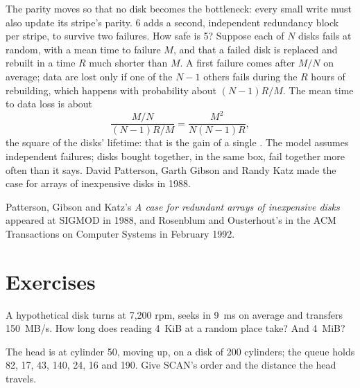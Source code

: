 The parity moves so that no disk becomes the bottleneck: every small write must also update its stripe's parity.  6 adds a second, independent redundancy block per stripe, to survive two failures. How safe is  5? Suppose each of $N$ disks fails at random, with a mean time to failure $M$, and that a failed disk is replaced and rebuilt in a time $R$ much shorter than $M$. A first failure comes after $M/N$ on average; data are lost only if one of the $N - 1$ others fails during the $R$ hours of rebuilding, which happens with probability about $(N - 1)R/M$. The mean time to data loss is about
\[ \frac{M/N}{(N - 1)R/M} = \frac{M^2}{N(N - 1)R}, \]
the square of the disks' lifetime: that is the gain of a single . The model assumes independent failures; disks bought together, in the same box, fail together more often than it says. David Patterson, Garth Gibson and Randy Katz made the case for arrays of inexpensive disks in 1988. %

\begin{history}[Storage]
Patterson, Gibson and Katz's \emph{A case for redundant arrays of inexpensive disks} appeared at SIGMOD in 1988, %
and Rosenblum and Ousterhout's  in the ACM Transactions on Computer Systems in February 1992. %
\end{history}

\section{Exercises}\label{sec:b3:file-systems:exercises}

\begin{exercise}[$\star$]\label{exo:b3:file-systems:1}
A hypothetical disk turns at 7,200 rpm, seeks in 9~ms on average and transfers 150~MB/s. How long does reading 4~KiB at a random place take? And 4~MiB?
\end{exercise}

\begin{exercise}[$\star$]\label{exo:b3:file-systems:2}
The head is at cylinder 50, moving up, on a disk of 200 cylinders; the queue holds 82, 17, 43, 140, 24, 16 and 190. Give SCAN's order and the distance the head travels.
\end{exercise}

